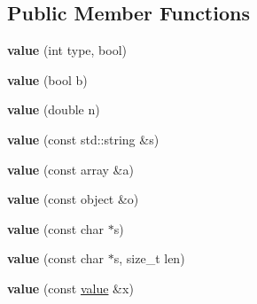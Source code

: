 \subsection*{Public Member Functions}
\begin{DoxyCompactItemize}
\item 
\hypertarget{classpicojson_1_1value_acd1d55ac7333a3e482e469b3d99fdf6e}{{\bfseries value} (int type, bool)}\label{classpicojson_1_1value_acd1d55ac7333a3e482e469b3d99fdf6e}

\item 
\hypertarget{classpicojson_1_1value_a43d8a33c3dbea0c5853bef4577a0d10e}{{\bfseries value} (bool b)}\label{classpicojson_1_1value_a43d8a33c3dbea0c5853bef4577a0d10e}

\item 
\hypertarget{classpicojson_1_1value_af19f6d5889d90e77e76af05aacaba321}{{\bfseries value} (double n)}\label{classpicojson_1_1value_af19f6d5889d90e77e76af05aacaba321}

\item 
\hypertarget{classpicojson_1_1value_aa4841f2dd8deeaffca7a225075b88da9}{{\bfseries value} (const std\+::string \&s)}\label{classpicojson_1_1value_aa4841f2dd8deeaffca7a225075b88da9}

\item 
\hypertarget{classpicojson_1_1value_a729e8f01d9bb4686daac82d0d3295afe}{{\bfseries value} (const array \&a)}\label{classpicojson_1_1value_a729e8f01d9bb4686daac82d0d3295afe}

\item 
\hypertarget{classpicojson_1_1value_a2b6beb88edf85e213893b805b354c87e}{{\bfseries value} (const object \&o)}\label{classpicojson_1_1value_a2b6beb88edf85e213893b805b354c87e}

\item 
\hypertarget{classpicojson_1_1value_a94f324d88fd16c1338fc9a228ec3dc3c}{{\bfseries value} (const char $\ast$s)}\label{classpicojson_1_1value_a94f324d88fd16c1338fc9a228ec3dc3c}

\item 
\hypertarget{classpicojson_1_1value_ae56da06e2b438f4425300a218150398d}{{\bfseries value} (const char $\ast$s, size\+\_\+t len)}\label{classpicojson_1_1value_ae56da06e2b438f4425300a218150398d}

\item 
\hypertarget{classpicojson_1_1value_a89a827eee72398d3678509cdd65c777d}{{\bfseries value} (const \hyperlink{classpicojson_1_1value}{value} \&x)}\label{classpicojson_1_1value_a89a827eee72398d3678509cdd65c777d}


\end{DoxyCompactItemize}
